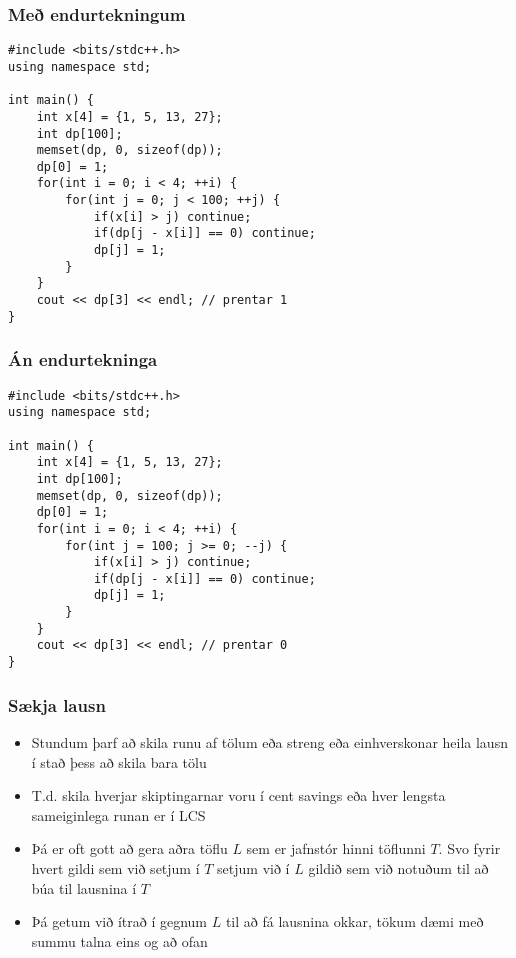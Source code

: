 \documentclass{beamer}
\begin{document}
\begin{frame}[fragile]
\frametitle{Með endurtekningum}

\begin{verbatim}
#include <bits/stdc++.h>
using namespace std;

int main() {
    int x[4] = {1, 5, 13, 27};
    int dp[100];
    memset(dp, 0, sizeof(dp));
    dp[0] = 1;
    for(int i = 0; i < 4; ++i) {
        for(int j = 0; j < 100; ++j) {
            if(x[i] > j) continue;
            if(dp[j - x[i]] == 0) continue;
            dp[j] = 1;
        }
    }
    cout << dp[3] << endl; // prentar 1
}
\end{verbatim}

\end{frame}

\begin{frame}[fragile]
\frametitle{Án endurtekninga}

\begin{verbatim}
#include <bits/stdc++.h>
using namespace std;

int main() {
    int x[4] = {1, 5, 13, 27};
    int dp[100];
    memset(dp, 0, sizeof(dp));
    dp[0] = 1;
    for(int i = 0; i < 4; ++i) {
        for(int j = 100; j >= 0; --j) {
            if(x[i] > j) continue;
            if(dp[j - x[i]] == 0) continue;
            dp[j] = 1;
        }
    }
    cout << dp[3] << endl; // prentar 0
}
\end{verbatim}

\end{frame}

\begin{frame}
\frametitle{Sækja lausn}

\begin{itemize}

\item<1-> Stundum þarf að skila runu af tölum eða streng eða einhverskonar heila lausn í stað þess að skila bara tölu

\item<2-> T.d. skila hverjar skiptingarnar voru í cent savings eða hver lengsta sameiginlega runan er í LCS

\item<3-> Þá er oft gott að gera aðra töflu $L$ sem er jafnstór hinni töflunni $T$. Svo fyrir hvert gildi sem við setjum í $T$ setjum við í $L$ gildið sem við notuðum til að búa til lausnina í $T$

\item<4-> Þá getum við ítrað í gegnum $L$ til að fá lausnina okkar, tökum dæmi með summu talna eins og að ofan

\end{itemize}

\end{frame}
\end{document}

